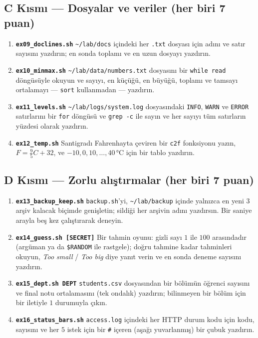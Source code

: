 \documentclass[11pt,a4paper]{article}
\newcommand{\cmd}[1]{\texttt{#1}}
\begin{document}
\subsection*{C Kısmı --- Dosyalar ve veriler (her biri 7 puan)}
\begin{enumerate}[leftmargin=1.6em,resume]
  \item \textbf{\texttt{ex09\_doclines.sh}} \texttt{\textasciitilde/lab/docs} içindeki her \texttt{.txt} dosyası için adını ve satır sayısını yazdırın; en sonda toplamı ve en uzun dosyayı yazdırın.
  \item \textbf{\texttt{ex10\_minmax.sh}} \texttt{\textasciitilde/lab/data/numbers.txt} dosyasını bir \texttt{while read} döngüsüyle okuyun ve sayıyı, en küçüğü, en büyüğü, toplamı ve tamsayı ortalamayı --- \cmd{sort} kullanmadan --- yazdırın.
  \item \textbf{\texttt{ex11\_levels.sh}} \texttt{\textasciitilde/lab/logs/system.log} dosyasındaki \texttt{INFO}, \texttt{WARN} ve \texttt{ERROR} satırlarını bir \texttt{for} döngüsü ve \cmd{grep -c} ile sayın ve her sayıyı tüm satırların yüzdesi olarak yazdırın.
  \item \textbf{\texttt{ex12\_temp.sh}} Santigradı Fahrenhayta çeviren bir \texttt{c2f} fonksiyonu yazın, $F = \frac{9}{5}C + 32$, ve $-10, 0, 10, \ldots, 40$\,°C için bir tablo yazdırın.
\end{enumerate}

\subsection*{D Kısmı --- Zorlu alıştırmalar (her biri 7 puan)}
\begin{enumerate}[leftmargin=1.6em,resume]
  \item \textbf{\texttt{ex13\_backup\_keep.sh}} \texttt{backup.sh}'yi, \texttt{\textasciitilde/lab/backup} içinde yalnızca en yeni $3$ arşiv kalacak biçimde genişletin; sildiği her arşivin adını yazdırsın. Bir saniye arayla beş kez çalıştırarak deneyin.
  \item \textbf{\texttt{ex14\_guess.sh [SECRET]}} Bir tahmin oyunu: gizli sayı $1$ ile $100$ arasındadır (argüman ya da \texttt{\$RANDOM} ile rastgele); doğru tahmine kadar tahminleri okuyun, \emph{Too small} / \emph{Too big} diye yanıt verin ve en sonda deneme sayısını yazdırın.
  \item \textbf{\texttt{ex15\_dept.sh DEPT}} \texttt{students.csv} dosyasından bir bölümün öğrenci sayısını ve final notu ortalamasını (tek ondalık) yazdırın; bilinmeyen bir bölüm için bir iletiyle $1$ durumuyla çıkın.
  \item \textbf{\texttt{ex16\_status\_bars.sh}} \texttt{access.log} içindeki her HTTP durum kodu için kodu, sayısını ve her $5$ istek için bir \texttt{\#} içeren (aşağı yuvarlanmış) bir çubuk yazdırın.
\end{enumerate}
\end{document}
